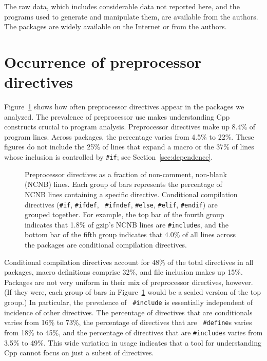 \documentclass[10pt]{article}
\newcommand{\captionsmall}[1]{\caption[]{\small #1}}
\begin{document}
The raw data, which includes considerable data not reported here, and the
programs used to generate and manipulate them, are available from the
authors.  The packages are widely available on the Internet 
or from the authors.


\section{Occurrence of preprocessor directives}
\label{sec:directives}
\label{sec:first-content-section}



Figure~\ref{fig:directives-breakdown} shows how often preprocessor
directives appear in the packages we analyzed.  The prevalence of
preprocessor use makes understanding Cpp constructs crucial to program
analysis.  Preprocessor directives make up 8.4\% of program lines.
Across packages, the percentage varies from 4.5\% to 22\%.  These
figures do not include the 25\% of lines that expand a macro or the
37\% of lines whose inclusion is controlled by {\tt \#if}; see
Section~\ref{sec:dependence}.

\begin{figure}
\centerline{}
\captionsmall{Preprocessor directives as a fraction of non-comment,
  non-blank (NCNB) lines.  Each group of bars represents the percentage of
  NCNB lines containing a specific directive.
  Conditional compilation directives ({\tt \#if}, {\tt \#ifdef}, {\tt
  \#ifndef}, {\tt \#else}, {\tt \#elif}, {\tt \#endif}) are grouped
  together.  For example, the top bar of the fourth group indicates that
  1.8\% of gzip's NCNB lines are {\tt \#include}s, and the bottom bar of the
  fifth group indicates that 4.0\% of all lines across the packages are
  conditional compilation directives.}
\label{fig:directives-breakdown}
\end{figure}





Conditional compilation directives account for 48\% of the total
directives in all packages, macro definitions comprise 32\%, and file
inclusion makes up 15\%.  Packages are not very uniform in their mix
of preprocessor directives, however.  (If they were, each group of
bars in Figure~\ref{fig:directives-breakdown} would be a scaled
version of the top group.)  In particular, the prevalence of {\tt
\#include} is essentially independent of incidence of other
directives.  The percentage of directives that are conditionals varies
from 16\% to 73\%, the percentage of directives that are {\tt
\#define}s varies from 18\% to 45\%, and the percentage of directives
that are {\tt \#include}s varies from 3.5\% to 49\%.  This wide variation
in usage indicates that a tool for understanding Cpp cannot focus on
just a subset of directives.
\end{document}
